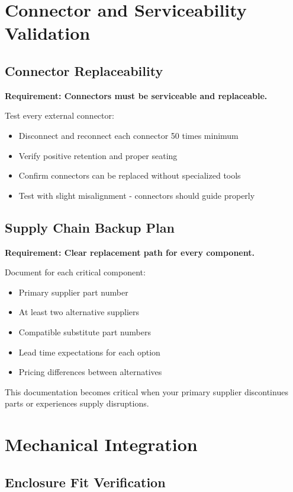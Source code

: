 \section{Connector and Serviceability Validation}

\subsection{Connector Replaceability}

\textbf{Requirement: Connectors must be serviceable and replaceable.}

Test every external connector:
\begin{itemize}
\item Disconnect and reconnect each connector 50 times minimum
\item Verify positive retention and proper seating
\item Confirm connectors can be replaced without specialized tools
\item Test with slight misalignment - connectors should guide properly
\end{itemize}

\subsection{Supply Chain Backup Plan}

\textbf{Requirement: Clear replacement path for every component.}

Document for each critical component:
\begin{itemize}
\item Primary supplier part number
\item At least two alternative suppliers
\item Compatible substitute part numbers
\item Lead time expectations for each option
\item Pricing differences between alternatives
\end{itemize}

This documentation becomes critical when your primary supplier discontinues parts or experiences supply disruptions.

\section{Mechanical Integration}

\subsection{Enclosure Fit Verification}

